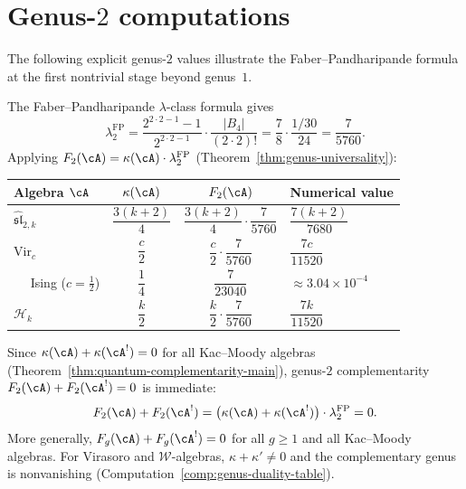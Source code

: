 \section{Genus-\texorpdfstring{$2$}{2} computations}
\label{sec:genus-2-computations}

The following explicit genus-$2$ values illustrate the Faber--Pandharipande formula at the first
nontrivial stage beyond genus~$1$.

\begin{computation}\label{comp:genus-2-values}
The Faber--Pandharipande $\lambda$-class formula gives
\begin{equation}\label{eq:lambda-2-value}
\lambda_2^{\mathrm{FP}}
  = \frac{2^{2 \cdot 2 - 1} - 1}{2^{2 \cdot 2 - 1}}
    \cdot \frac{|B_4|}{(2 \cdot 2)!}
  = \frac{7}{8} \cdot \frac{1/30}{24}
  = \frac{7}{5760}.
\end{equation}
Applying $F_2(\cA) = \kappa(\cA) \cdot \lambda_2^{\mathrm{FP}}$
\textup{(}Theorem~\textup{\ref{thm:genus-universality})}:
\begin{center}
\renewcommand{\arraystretch}{1.2}
\begin{tabular}{lccl}
\toprule
Algebra $\cA$ & $\kappa(\cA)$ & $F_2(\cA)$ & Numerical value \\
\midrule
$\widehat{\mathfrak{sl}}_{2,k}$
  & $\dfrac{3(k+2)}{4}$
  & $\dfrac{3(k+2)}{4} \cdot \dfrac{7}{5760}$
  & $\dfrac{7(k+2)}{7680}$ \\[6pt]
$\mathrm{Vir}_c$
  & $\dfrac{c}{2}$
  & $\dfrac{c}{2} \cdot \dfrac{7}{5760}$
  & $\dfrac{7c}{11520}$ \\[6pt]
$\quad$ Ising ($c = \tfrac{1}{2}$)
  & $\dfrac{1}{4}$
  & $\dfrac{7}{23040}$
  & $\approx 3.04 \times 10^{-4}$ \\[6pt]
$\mathcal{H}_k$
  & $\dfrac{k}{2}$
  & $\dfrac{k}{2} \cdot \dfrac{7}{5760}$
  & $\dfrac{7k}{11520}$ \\
\bottomrule
\end{tabular}
\end{center}
\end{computation}

\begin{remark}
\label{rem:genus-2-complementarity}
Since $\kappa(\cA) + \kappa(\cA^!) = 0$ for all Kac--Moody algebras
\textup{(}Theorem~\textup{\ref{thm:quantum-complementarity-main})},
genus-$2$ complementarity $F_2(\cA) + F_2(\cA^!) = 0$ is immediate:
\[
F_2(\cA) + F_2(\cA^!)
  = \bigl(\kappa(\cA) + \kappa(\cA^!)\bigr) \cdot \lambda_2^{\mathrm{FP}}
  = 0.
\]
More generally, $F_g(\cA) + F_g(\cA^!) = 0$ for all $g \geq 1$
and all Kac--Moody algebras.  For Virasoro and $\mathcal{W}$-algebras,
$\kappa + \kappa' \neq 0$ and the complementary genus is nonvanishing
\textup{(}Computation~\textup{\ref{comp:genus-duality-table})}.
\end{remark}
